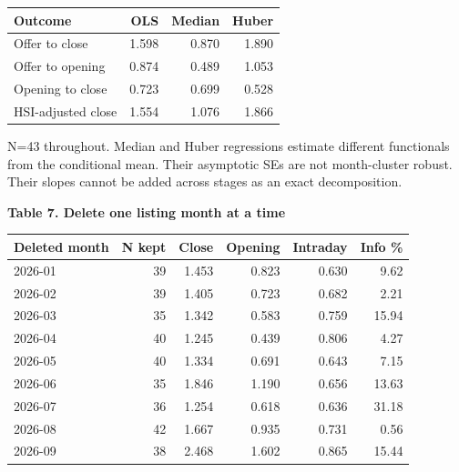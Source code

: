 \documentclass[10pt,a4paper]{article}
\begin{document}
{\small\renewcommand{\arraystretch}{1.10}\begin{tabularx}{\textwidth}{@{}Xrrr@{}}\toprule

\textbf{Outcome} & \textbf{OLS} & \textbf{Median} & \textbf{Huber} \\\midrule

Offer to close & 1.598 & 0.870 & 1.890 \\

Offer to opening & 0.874 & 0.489 & 1.053 \\

Opening to close & 0.723 & 0.699 & 0.528 \\

HSI-adjusted close & 1.554 & 1.076 & 1.866 \\

\bottomrule\end{tabularx}}\par

{\footnotesize N=43 throughout. Median and Huber regressions estimate different functionals from the conditional mean. Their asymptotic SEs are not month-cluster robust. Their slopes cannot be added across stages as an exact decomposition.}\par

\par\addvspace{5pt}\textbf{Table 7. Delete one listing month at a time}\par\nobreak\vspace{2pt}

{\small\renewcommand{\arraystretch}{1.10}\begin{tabularx}{\textwidth}{@{}Xrrrrr@{}}\toprule

\textbf{Deleted month} & \textbf{N kept} & \textbf{Close} & \textbf{Opening} & \textbf{Intraday} & \textbf{Info \%} \\\midrule

2026-01 & 39 & 1.453 & 0.823 & 0.630 & 9.62 \\

2026-02 & 39 & 1.405 & 0.723 & 0.682 & 2.21 \\

2026-03 & 35 & 1.342 & 0.583 & 0.759 & 15.94 \\

2026-04 & 40 & 1.245 & 0.439 & 0.806 & 4.27 \\

2026-05 & 40 & 1.334 & 0.691 & 0.643 & 7.15 \\

2026-06 & 35 & 1.846 & 1.190 & 0.656 & 13.63 \\

2026-07 & 36 & 1.254 & 0.618 & 0.636 & 31.18 \\

2026-08 & 42 & 1.667 & 0.935 & 0.731 & 0.56 \\

2026-09 & 38 & 2.468 & 1.602 & 0.865 & 15.44 \\

\bottomrule\end{tabularx}}\par
\end{document}
